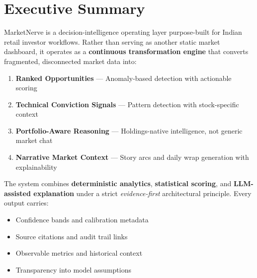 \documentclass[11pt,a4paper]{article}
\newcommand{\highlight}[1]{\colorbox{mn-light}{\textcolor{mn-navy}{#1}}}
\begin{document}
\newpage
\setcounter{page}{2}
{\color{mn-navy}\tableofcontents}
\newpage

\section{Executive Summary}

MarketNerve is a \highlight{decision-intelligence operating layer} purpose-built for Indian retail investor workflows. Rather than serving as another static market dashboard, it operates as a \textbf{continuous transformation engine} that converts fragmented, disconnected market data into:

\begin{enumerate}[label={\color{mn-blue}\textbf{\arabic*}}, leftmargin=1.5cm]
    \item \textbf{Ranked Opportunities} — Anomaly-based detection with actionable scoring
    \item \textbf{Technical Conviction Signals} — Pattern detection with stock-specific context
    \item \textbf{Portfolio-Aware Reasoning} — Holdings-native intelligence, not generic market chat
    \item \textbf{Narrative Market Context} — Story arcs and daily wrap generation with explainability
\end{enumerate}

\vspace{0.5cm}

The system combines \textbf{deterministic analytics}, \textbf{statistical scoring}, and \textbf{LLM-assisted explanation} under a strict \textit{evidence-first} architectural principle. Every output carries:

\begin{tcolorbox}[colback=mn-light, colframe=mn-blue, arc=1mm, boxsep=8pt]
\small
\begin{itemize}[label={•}, leftmargin=1.2cm]
    \item Confidence bands and calibration metadata
    \item Source citations and audit trail links
    \item Observable metrics and historical context
    \item Transparency into model assumptions
\end{itemize}
\end{tcolorbox}
\end{document}
